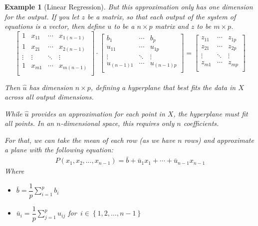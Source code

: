 \documentclass{book}
\newtheorem{example}{Example}[section]
\begin{document}
\begin{example}[Linear Regression]
    But this approximation only has one dimension for the output. If you let $z$ be
    a matrix, so that each output of the system of equations is a vector, then
    define $u$ to be a $n\times p$ matrix and $z$ to be $m\times p$.
    \begin{equation}
        \left[
            \begin{matrix}
                1      & x_{11} & \cdots & x_{1(n-1)} \\
                1      & x_{21} & \cdots & x_{2(n-1)} \\
                \vdots & \vdots & \ddots & \vdots     \\
                1      & x_{m1} & \cdots & x_{m(n-1)} \\
            \end{matrix}
            \right]\cdot \left[
            \begin{matrix}
                b_1        & \cdots & b_p        \\
                u_{11}     & \cdots & u_{1p}     \\
                \vdots     & \ddots & \vdots     \\
                u_{(n-1)1} & \cdots & u_{(n-1)p} \\
            \end{matrix}
            \right] = \left[
            \begin{matrix}
                z_{11} & \cdots & z_{1p} \\
                z_{21} & \cdots & z_{2p} \\
                \vdots & \ddots & \vdots \\
                z_{m1} & \cdots & z_{mp} \\
            \end{matrix}
            \right]
    \end{equation}

    Then $\hat u$ has dimension $n \times p$, defining a hyperplane that best fits
    the data in $X$ across all output dimensions.

    While $\hat u$ provides an approximation for each point in $X$, the hyperplane
    must fit all points. In an $n$-dimensional space, this requires only $n$
    coefficients.

    For that, we can take the mean of each row (as we have $n$ rows) and
    approximate a plane with the following equation:
    \begin{equation}
        \begin{split}
            P(x_1, x_2, \dots, x_{n-1}) = \bar{b} + \bar{u}_1 x_1 + \cdots + \bar{u}_{n-1} x_{n-1}        \end{split}
    \end{equation} Where
    \begin{itemize}
        \item $\bar{b} = \dfrac{1}{p}\sum_{i=1}^{p}{b_i}$
        \item $\bar{u}_i = \dfrac{1}{p}\sum_{j=1}^{p}{u_{i j}}$ for $\,i\in\left\{1,2,\dots,n-1\right\}$
    \end{itemize}


\end{example}
\end{document}
